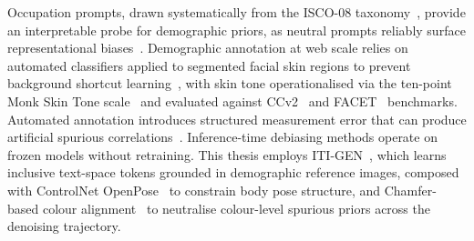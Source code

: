 Occupation prompts, drawn systematically from the ISCO-08 taxonomy~\cite{ILO_ISCO08},
provide an interpretable probe for demographic priors, as neutral prompts reliably
surface representational biases~\cite{Naik_2023_SocialBiasesThroughTheTextToImageGenerationLens,
	Bianchi_2023_TTIGenAmplifiesDemographicStereotypes,
	Luccioni_2023_AnalyzingSocietalRepresentationsDiffusionModels}. Demographic annotation
at web scale relies on automated classifiers applied to segmented facial skin regions
to prevent background shortcut learning~\cite{Matias_2024_EnhancingFairnessMST}, with
skin tone operationalised via the ten-point Monk Skin Tone scale~\cite{Schumann_2024_MonkSkinTone}
and evaluated against CCv2~\cite{Porgali_2023_CCv2} and FACET~\cite{Gustafson_2023_FACET}
benchmarks. Automated annotation introduces structured measurement error that can
produce artificial spurious correlations~\cite{Buolamwini_2018_GenderShades}.
Inference-time debiasing methods operate on frozen models without retraining. This
thesis employs ITI-GEN~\cite{Zhang_2023_ITIGEN}, which learns inclusive text-space
tokens grounded in demographic reference images, composed with ControlNet
OpenPose~\cite{LZhang_2023_ControlNet} to constrain body pose structure, and
Chamfer-based colour alignment~\cite{Shum_2025_ColorAlignment} to neutralise
colour-level spurious priors across the denoising trajectory.